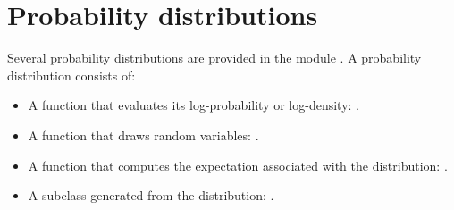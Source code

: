 \documentclass[]{jss}
\begin{document}
\section{Probability distributions} 
\label{chap:distributions}
Several probability distributions are provided in the module . A probability distribution consists of:
\begin{itemize}
    \item A function that evaluates its log-probability or log-density: .
    \item A function that draws random variables: .
    \item A function that computes the expectation associated with the distribution: .
    \item A  subclass generated from the distribution: .
\end{itemize} 
%



\end{document}

